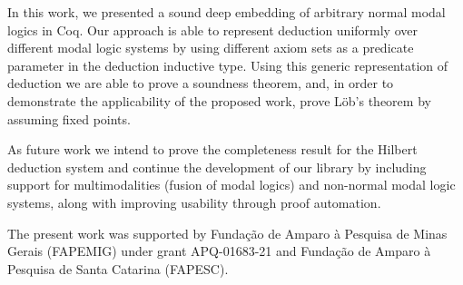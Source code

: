\documentclass[sigconf]{acmart}
\begin{document}
In this work, we presented a sound deep embedding of arbitrary
normal modal logics in Coq. Our approach is able to represent deduction
uniformly over different modal logic systems by using different axiom sets
as a predicate parameter in the deduction inductive type. Using this generic
representation of deduction we are able to prove a soundness theorem, and, in
order to demonstrate the applicability of the proposed work, prove L\"ob's theorem
by assuming fixed points. %

As future work we intend to prove the completeness result for the Hilbert
deduction system and continue the development of our library by including
support for multimodalities (fusion of modal logics) and non-normal modal
logic systems, along with improving usability through proof automation.

\begin{acks}
  The present work was supported by Fundação de Amparo à Pesquisa de Minas
  Gerais (FAPEMIG) under grant APQ-01683-21 and Fundação de Amparo à Pesquisa de
  Santa Catarina (FAPESC). %
\end{acks}




\end{document}
